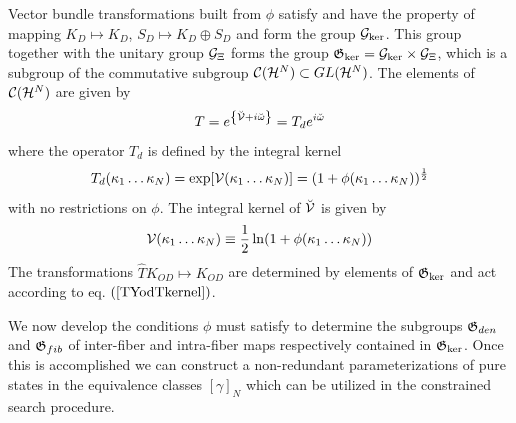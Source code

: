 Vector bundle transformations built from $\phi $ satisfy %
and have the property of mapping $K_{D}\mapsto K_{D}$, $S_{D}\mapsto
K_{D}\oplus S_{D}$ and form the group ${\cal G}_{\ker }$. This group
together with the unitary group ${\cal G}_{\Xi }$ forms the group ${\frak G}%
_{\ker }={\cal G}_{\ker }\times {\cal G}_{\Xi }$, which is a subgroup of the
commutative subgroup ${\cal C}({\cal H}^{N})\subset GL({\cal H}^{N})$. The
elements of ${\cal C}({\cal H}^{N})$ are given by 
\begin{equation}
T=e^{\left\{ {\cal \breve{V}}+i\breve{\omega}\right\} }=T_{d}e^{i\breve{%
\omega}}
\end{equation}%
where the operator $T_{d}$ is defined by the integral kernel 
\begin{equation}
T_{d}(\kappa _{1}\ldots \kappa _{N})=\exp [{\cal V}(\kappa _{1}\ldots \kappa
_{N})]=(1+\phi (\kappa _{1}\ldots \kappa _{N}))^{\frac{1}{2}}
\end{equation}%
with no restrictions on $\phi $. The integral kernel of ${\cal \breve{V}}$
is given by 
\begin{equation}
{\cal V}(\kappa _{1}\ldots \kappa _{N})\equiv \frac{1}{2}\ln (1+\phi (\kappa
_{1}\ldots \kappa _{N}))  \label{Vhalfln}
\end{equation}%
The transformations $\hat{T}K_{OD}\mapsto K_{OD}$ are determined by elements
of ${\frak G}_{\ker }$ and act according to eq. $\left( \ref{TYodTkernel}%
\right) $.

We now develop the conditions $\phi $ must satisfy to determine the
subgroups ${\frak G}_{den}$ and ${\frak G}_{fib}$ of inter-fiber and
intra-fiber maps respectively contained in ${\frak G}_{\ker }$. Once this is
accomplished we can construct a non-redundant parameterizations of pure
states in the equivalence classes $\left[ \gamma \right] _{N}$ which can be
utilized in the constrained search procedure.

